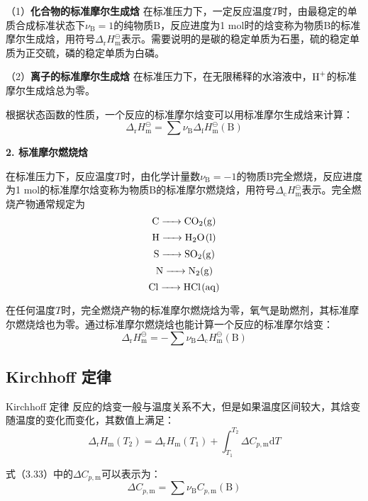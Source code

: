 \documentclass[lang=cn,newtx,11pt,scheme=chinese]{elegantbook}
\begin{document}
（1）\textbf{化合物的标准摩尔生成焓} \quad 在标准压力下，一定反应温度$T$时，由最稳定的单质合成标准状态下$\nu_\mathrm{B}=1$的纯物质B，反应进度为1 mol时的焓变称为物质B的标准摩尔生成焓，用符号$\Delta_\mathrm{r}H^\ominus_\mathrm{m}$表示。需要说明的是碳的稳定单质为石墨，硫的稳定单质为正交硫，磷的稳定单质为白磷。

（2）\textbf{离子的标准摩尔生成焓} \quad 在标准压力下，在无限稀释的水溶液中，$\ce{H+}$的标准摩尔生成焓总为零。

根据状态函数的性质，一个反应的标准摩尔焓变可以用标准摩尔生成焓来计算：
\begin{equation}
	\Delta_\mathrm{r}H^\ominus _\mathrm{m}=\sum \nu _\mathrm{B}\Delta _\mathrm{f}H^\ominus _\mathrm{m}(\mathrm{B} )     
\end{equation}

\textbf{2. 标准摩尔燃烧焓}

在标准压力下，反应温度$T$时，由化学计量数$\nu_\mathrm{B}=-1$的物质B完全燃烧，反应进度为1 mol的标准摩尔焓变称为物质B的标准摩尔燃烧焓，用符号$\Delta_\mathrm{c}H^\ominus_\mathrm{m}$表示。完全燃烧产物通常规定为
$$\ce{C -> CO2(g)}$$
$$\ce{H -> H2O(l)}$$
$$\ce{S -> SO2(g)}$$
$$\ce{N -> N2(g)}$$
$$\ce{Cl -> HCl(aq)}$$

在任何温度$T$时，完全燃烧产物的标准摩尔燃烧焓为零，氧气是助燃剂，其标准摩尔燃烧焓也为零。通过标准摩尔燃烧焓也能计算一个反应的标准摩尔焓变：
\begin{equation}
	\Delta_\mathrm{r}H^\ominus _\mathrm{m}=-\sum \nu _\mathrm{B}\Delta _\mathrm{c}H^\ominus _\mathrm{m}(\mathrm{B} )     
\end{equation}

\subsection{Kirchhoff 定律}
\begin{theorem}{Kirchhoff 定律}
	反应的焓变一般与温度关系不大，但是如果温度区间较大，其焓变随温度的变化而变化，其数值上满足：
	\begin{equation}
		\Delta_\mathrm{r}  H_\mathrm{m}(T_2)= \Delta_\mathrm{r}  H_\mathrm{m}(T_1)+\int_{T_1}^{T_2}\Delta C_{p,\mathrm{m} } \mathrm{d}T 
	\end{equation}
\end{theorem}

式（3.33）中的$\Delta C_{p,\mathrm{m} }$可以表示为：
\begin{equation}
	\Delta C_{p,\mathrm{m} }=\sum \nu_\mathrm{B} C_{p,\mathrm{m} }(\mathrm{B})
\end{equation}
\end{document}
